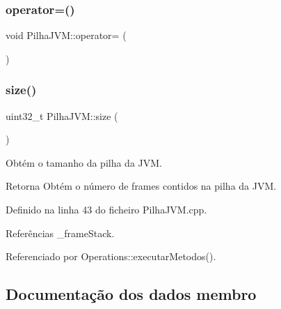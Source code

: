 \mbox{\label{classPilhaJVM_a636c01ded057b339aa00486003db9037}} 
\subsubsection{\texorpdfstring{operator=()}{operator=()}}
{\footnotesize\ttfamily void Pilha\+J\+V\+M\+::operator= (\begin{DoxyParamCaption}\item[{\hyperlink{classPilhaJVM}{Pilha\+J\+VM} const \&}]{ }\end{DoxyParamCaption})\hspace{0.3cm}{\ttfamily [private]}}

\mbox{\label{classPilhaJVM_a22d7bcd7db598b00ae219c9c2efb2c88}} 
\subsubsection{\texorpdfstring{size()}{size()}}
{\footnotesize\ttfamily uint32\+\_\+t Pilha\+J\+V\+M\+::size (\begin{DoxyParamCaption}{ }\end{DoxyParamCaption})}



Obtém o tamanho da pilha da J\+VM. 

\begin{DoxyReturn}{Retorna}
Obtém o número de frames contidos na pilha da J\+VM. 
\end{DoxyReturn}


Definido na linha 43 do ficheiro Pilha\+J\+V\+M.\+cpp.



Referências \+\_\+frame\+Stack.



Referenciado por Operations\+::executar\+Metodos().



\subsection{Documentação dos dados membro}
\mbox{\label{classPilhaJVM_a09290179ef6c914aa32297ab9dae94ed}} 
